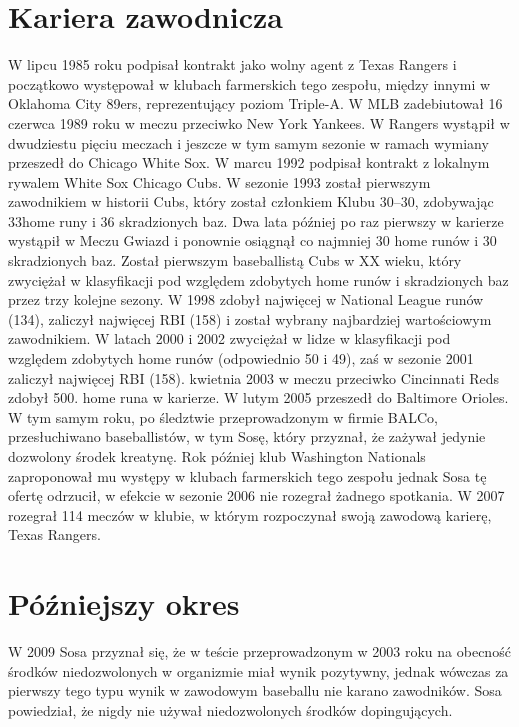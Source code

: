 \documentclass[a4paper,12pt]{article}
\begin{document}
\section{Kariera zawodnicza}
W lipcu 1985 roku podpisał kontrakt jako wolny agent z Texas Rangers i początkowo występował w klubach farmerskich tego zespołu, między innymi w Oklahoma City 89ers, reprezentujący poziom Triple-A. W MLB zadebiutował 16 czerwca 1989 roku w meczu przeciwko New York Yankees. W Rangers wystąpił w dwudziestu pięciu meczach i jeszcze w tym samym sezonie w ramach wymiany przeszedł do Chicago White Sox.
\newline
\newline
W marcu 1992 podpisał kontrakt z lokalnym rywalem White Sox Chicago Cubs. W sezonie 1993 został pierwszym zawodnikiem w historii Cubs, który został członkiem Klubu 30–30, zdobywając 33home runy i 36 skradzionych baz. Dwa lata później po raz pierwszy w karierze wystąpił w Meczu Gwiazd i ponownie osiągnął co najmniej 30 home runów i 30 skradzionych baz. Został pierwszym baseballistą Cubs w XX wieku, który zwyciężał w klasyfikacji pod względem zdobytych home runów i skradzionych baz przez trzy kolejne sezony. W 1998 zdobył najwięcej w National League runów (134), zaliczył najwięcej RBI (158) i został wybrany najbardziej wartościowym zawodnikiem. W latach 2000 i 2002 zwyciężał w lidze w klasyfikacji pod względem zdobytych home runów (odpowiednio 50 i 49), zaś w sezonie 2001 zaliczył najwięcej RBI (158).
\newline
{} kwietnia 2003 w meczu przeciwko Cincinnati Reds zdobył 500. home runa w karierze. W lutym 2005 przeszedł do Baltimore Orioles. W tym samym roku, po śledztwie przeprowadzonym w firmie BALCo, przesłuchiwano baseballistów, w tym Sosę, który przyznał, że zażywał jedynie dozwolony środek kreatynę.
\newline
\newline
Rok później klub Washington Nationals zaproponował mu występy w klubach farmerskich tego zespołu jednak Sosa tę ofertę odrzucił, w efekcie w sezonie 2006 nie rozegrał żadnego spotkania. W 2007 rozegrał 114 meczów w klubie, w którym rozpoczynał swoją zawodową karierę, Texas Rangers.

\section{Późniejszy okres}
W 2009 Sosa przyznał się, że w teście przeprowadzonym w 2003 roku na obecność środków niedozwolonych w organizmie miał wynik pozytywny, jednak wówczas za pierwszy tego typu wynik w zawodowym baseballu nie karano zawodników. Sosa powiedział, że nigdy nie używał niedozwolonych środków dopingujących.
\end{document}
